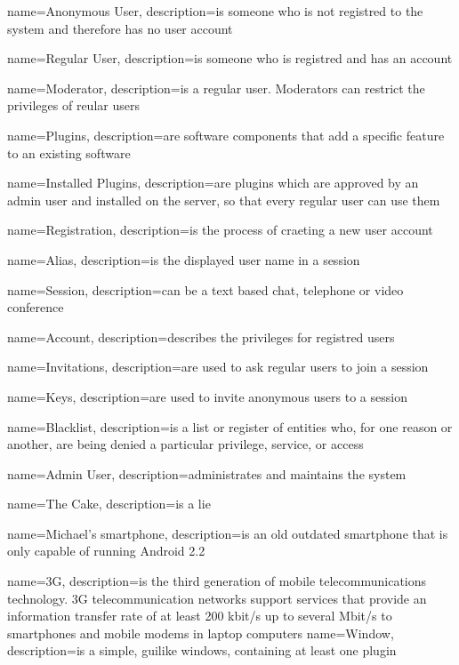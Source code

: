 {
  name=Anonymous User,
  description={is someone who is not registred to the system and therefore has no user account}
}

{
  name=Regular User,
  description={is someone who is registred and has an account}
}

{
  name=Moderator,
  description={is a regular user. Moderators can restrict the privileges of reular users}
}

{
  name=Plugins,
  description={are software components that add a specific feature to an existing software}
}

{
  name=Installed Plugins,
  description={are plugins which are approved by an admin user and installed on the server, so that every regular user can use them}
}

{
  name=Registration,
  description={is the process of craeting a new user account}
}

{
  name=Alias,
  description={is the displayed user name in a session}
}

{
  name=Session,
  description={can be a text based chat, telephone or video conference}
}

{
  name=Account,
  description={describes the privileges for registred users}
}

{
  name=Invitations,
  description={are used to ask regular users to join a session}
}

{
  name=Keys,
  description={are used to invite anonymous users to a session}
}

{
  name=Blacklist,
  description={is a list or register of entities who, for one reason or another, are being denied a particular privilege, service, or access}
}

{
  name=Admin User,
  description={administrates and maintains the system}
}

{
  name=The Cake,
  description={is a lie}
}

{
  name=Michael's smartphone,
  description={is an old outdated smartphone that is only capable of running Android 2.2}
}

{
  name=3G,
  description={is the third generation of mobile telecommunications technology. 3G telecommunication networks support services that provide an information transfer rate of at least 200 kbit/s up to several Mbit/s to smartphones and mobile modems in laptop computers}
}
{
  name=Window,
  description={is a simple, guilike windows, containing at least one plugin}
}

